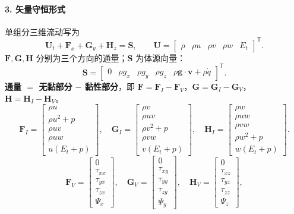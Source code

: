 \paragraph{3. 矢量守恒形式}
单组分三维流动写为
\begin{equation}
 \boxed{\mathbf U_t+\mathbf F_x+\mathbf G_y+\mathbf H_z=\mathbf S},
 \qquad
 \mathbf U=\begin{bmatrix}\rho&\rho u&\rho v&\rho w&E_t\end{bmatrix}^{\mathsf T}.
 \label{eq:cfd-vector-conservation}
\end{equation}
$\mathbf F,\mathbf G,\mathbf H$ 分别为三个方向的通量；$\mathbf S$ 为体源向量：
\[
 \mathbf S=\begin{bmatrix}
 0&\rho g_x&\rho g_y&\rho g_z&\rho\mathbf g\cdot\mathbf v+\rho\dot q
 \end{bmatrix}^{\mathsf T}.
\]
\textbf{通量 $=$ 无黏部分 $-$ 黏性部分}，即
$\mathbf F=\mathbf F_I-\mathbf F_V$，$\mathbf G=\mathbf G_I-\mathbf G_V$，
$\mathbf H=\mathbf H_I-\mathbf H_V$。
\begin{equation}
 \mathbf F_I=\begin{bmatrix}\rho u\\\rho u^2+p\\\rho uv\\\rho uw\\u(E_t+p)\end{bmatrix},\quad
 \mathbf G_I=\begin{bmatrix}\rho v\\\rho uv\\\rho v^2+p\\\rho vw\\v(E_t+p)\end{bmatrix},\quad
 \mathbf H_I=\begin{bmatrix}\rho w\\\rho uw\\\rho vw\\\rho w^2+p\\w(E_t+p)\end{bmatrix}.
 \label{eq:cfd-inviscid-fluxes}
\end{equation}
\begin{equation}
 \mathbf F_V=\begin{bmatrix}0\\\tau_{xx}\\\tau_{yx}\\\tau_{zx}\\\Psi_x\end{bmatrix},\quad
 \mathbf G_V=\begin{bmatrix}0\\\tau_{xy}\\\tau_{yy}\\\tau_{zy}\\\Psi_y\end{bmatrix},\quad
 \mathbf H_V=\begin{bmatrix}0\\\tau_{xz}\\\tau_{yz}\\\tau_{zz}\\\Psi_z\end{bmatrix},
 \label{eq:cfd-viscous-fluxes}
\end{equation}
